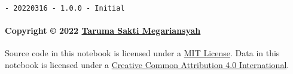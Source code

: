 \documentclass[11pt]{article}
\begin{document}
\begin{verbatim}
- 20220316 - 1.0.0 - Initial
\end{verbatim}

\hypertarget{copyright-2022-taruma-sakti-megariansyah}{%
\paragraph{\texorpdfstring{Copyright © 2022
\href{https://taruma.github.io}{Taruma Sakti
Megariansyah}}{Copyright © 2022 Taruma Sakti Megariansyah}}\label{copyright-2022-taruma-sakti-megariansyah}}

Source code in this notebook is licensed under a
\href{https://choosealicense.com/licenses/mit/}{MIT License}. Data in
this notebook is licensed under a
\href{https://creativecommons.org/licenses/by/4.0/}{Creative Common
Attribution 4.0 International}.


    
    
    
\end{document}
